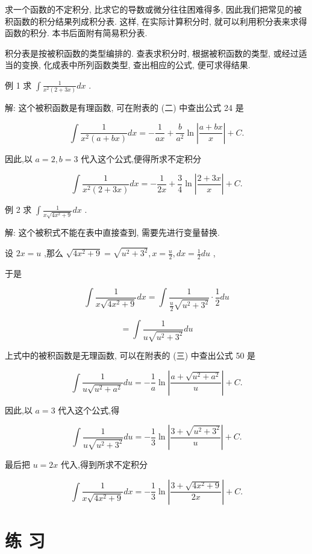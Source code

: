 \documentclass[10pt]{article}
\begin{document}
求一个函数的不定积分, 比求它的导数或微分往往困难得多, 因此我们把常见的被积函数的积分结果列成积分表. 这样, 在实际计算积分时, 就可以利用积分表来求得函数的积分. 本书后面附有简易积分表.

积分表是按被积函数的类型编排的. 查表求积分时, 根据被积函数的类型, 或经过适当的变换, 化成表中所列函数类型, 查出相应的公式, 便可求得结果.

例 1 求 \(\int \frac{1}{{x}^{2}\left( {2 + {3x}}\right) }{dx}\) .

解: 这个被积函数是有理函数, 可在附表的 (二) 中查出公式 24 是

\[
\int \frac{1}{{x}^{2}\left( {a + {bx}}\right) }{dx} = - \frac{1}{ax} + \frac{b}{{a}^{2}}\ln \left| \frac{a + {bx}}{x}\right| + C.
\]

因此,以 \(a = 2,b = 3\) 代入这个公式,便得所求不定积分

\[
\int \frac{1}{{x}^{2}\left( {2 + {3x}}\right) }{dx} = - \frac{1}{2x} + \frac{3}{4}\ln \left| \frac{2 + {3x}}{x}\right| + C.
\]

例 2 求 \(\int \frac{1}{x\sqrt{4{x}^{2} + 9}}{dx}\) .

解: 这个被积式不能在表中直接查到, 需要先进行变量替换.

设 \({2x} = u\) ,那么 \(\sqrt{4{x}^{2} + 9} = \sqrt{{u}^{2} + {3}^{2}},x = \frac{u}{2},{dx} = \frac{1}{2}{du}\) ,

于是

\[
\int \frac{1}{x\sqrt{4{x}^{2} + 9}}{dx} = \int \frac{1}{\frac{u}{2}\sqrt{{u}^{2} + {3}^{2}}} \cdot \frac{1}{2}{du}
\]

\[
= \int \frac{1}{u\sqrt{{u}^{2} + {3}^{2}}}{du}
\]

上式中的被积函数是无理函数, 可以在附表的 (三) 中查出公式 50 是

\[
\int \frac{1}{u\sqrt{{u}^{2} + {a}^{2}}}{du} = - \frac{1}{a}\ln \left| \frac{a + \sqrt{{u}^{2} + {a}^{2}}}{u}\right| + C.
\]

因此,以 \(a = 3\) 代入这个公式,得

\[
\int \frac{1}{u\sqrt{{u}^{2} + {3}^{2}}}{du} = - \frac{1}{3}\ln \left| \frac{3 + \sqrt{{u}^{2} + {3}^{2}}}{u}\right| + C.
\]

最后把 \(u = {2x}\) 代入,得到所求不定积分

\[
\int \frac{1}{x\sqrt{4{x}^{2} + 9}}{dx} = - \frac{1}{3}\ln \left| \frac{3 + \sqrt{4{x}^{2} + 9}}{2x}\right| + C.
\]

\section*{练 习}
\end{document}
